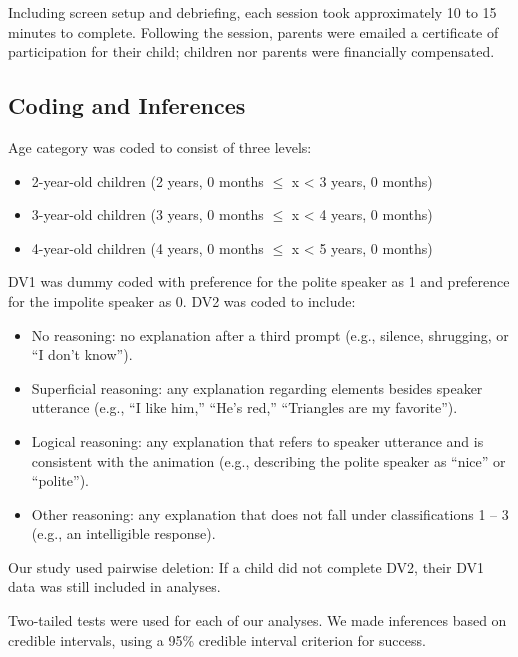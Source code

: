 \documentclass[
  english,
  man,floatsintext]{apa6}
\begin{document}
Including screen setup and debriefing, each session took approximately 10 to 15 minutes to complete. Following the session, parents were emailed a certificate of participation for their child; children nor parents were financially compensated.

\hypertarget{coding-and-inferences}{%
\subsection{Coding and Inferences}\label{coding-and-inferences}}

Age category was coded to consist of three levels:

\begin{itemize}
\item
  2-year-old children (2 years, 0 months \(\leqslant\) x \textless{} 3 years, 0 months)
\item
  3-year-old children (3 years, 0 months \(\leqslant\) x \textless{} 4 years, 0 months)
\item
  4-year-old children (4 years, 0 months \(\leqslant\) x \textless{} 5 years, 0 months)
\end{itemize}

DV1 was dummy coded with preference for the polite speaker as 1 and preference for the impolite speaker as 0. DV2 was coded to include:

\begin{itemize}
\item
  No reasoning: no explanation after a third prompt (e.g., silence, shrugging, or ``I don't know'').
\item
  Superficial reasoning: any explanation regarding elements besides speaker utterance (e.g., ``I like him,'' ``He's red,'' ``Triangles are my favorite'').
\item
  Logical reasoning: any explanation that refers to speaker utterance and is consistent with the animation (e.g., describing the polite speaker as ``nice'' or ``polite'').
\item
  Other reasoning: any explanation that does not fall under classifications 1 -- 3 (e.g., an intelligible response).
\end{itemize}

Our study used pairwise deletion: If a child did not complete DV2, their DV1 data was still included in analyses.

Two-tailed tests were used for each of our analyses. We made inferences based on credible intervals, using a 95\% credible interval criterion for success.
\end{document}
